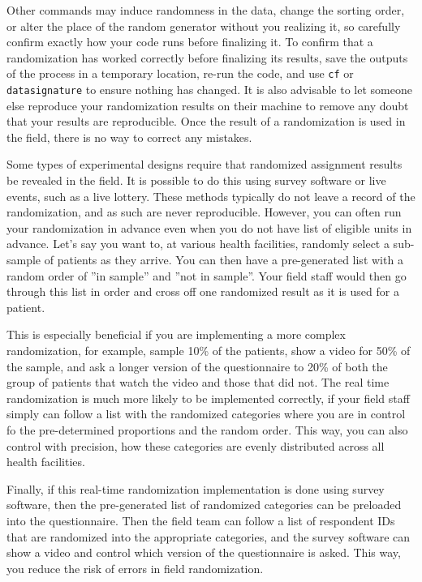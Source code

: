 Other commands may induce randomness in the data,
change the sorting order,
or alter the place of the random generator without you realizing it,
so carefully confirm exactly how your code runs before finalizing it.
To confirm that a randomization has worked correctly before finalizing its results,
save the outputs of the process in a temporary location,
re-run the code, and use \texttt{cf} or \texttt{datasignature} to ensure
nothing has changed. It is also advisable to let someone else reproduce your
randomization results on their machine to remove any doubt that your results
are reproducible.
Once the result of a randomization is used in the field,
there is no way to correct any mistakes.


Some types of experimental designs require
that randomized assignment results be revealed in the field.
It is possible to do this using survey software or live events, such as a live lottery.
These methods typically do not leave a record of the randomization,
and as such are never reproducible. 
However, you can often run your randomization in advance 
even when you do not have list of eligible units in advance.
Let's say you want to, at various health facilities, 
randomly select a sub-sample of patients as they arrive.
You can then have a pre-generated list 
with a random order of ''in sample'' and ''not in sample''.
Your field staff would then go through this list in order
and cross off one randomized result as it is used for a patient.

This is especially beneficial if you are implementing a more complex randomization,
for example, sample 10\% of the patients, show a video for 50\% of the sample, 
and ask a longer version of the questionnaire to 20\% of both 
the group of patients that watch the video and those that did not.
The real time randomization is much more likely to be implemented correctly,
if your field staff simply can follow a list with the randomized categories
where you are in control fo the pre-determined proportions and the random order.
This way, you can also control with precision,
how these categories are evenly distributed across all health facilities.

Finally, if this real-time randomization implementation is done using survey software,
then the pre-generated list of randomized categories can be preloaded
into the questionnaire.
Then the field team can follow a list of respondent IDs 
that are randomized into the appropriate categories,
and the survey software can show a video and control which version of the questionnaire is asked.
This way, you reduce the risk of errors in field randomization.


